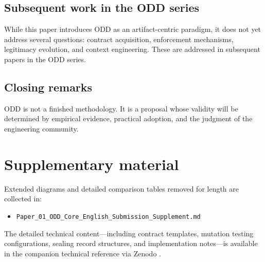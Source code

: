 \documentclass[conference]{IEEEtran}
\begin{document}
\subsection{Subsequent work in the ODD series}
While this paper introduces ODD as an artifact-centric paradigm, it does not yet address several questions: contract acquisition, enforcement mechanisms, legitimacy evolution, and context engineering. These are addressed in subsequent papers in the ODD series.

\subsection{Closing remarks}
ODD is not a finished methodology. It is a proposal whose validity will be determined by empirical evidence, practical adoption, and the judgment of the engineering community.

\appendices
\section{Supplementary material}
Extended diagrams and detailed comparison tables removed for length are collected in:
\begin{itemize}
\item \texttt{Paper\_01\_ODD\_Core\_English\_Submission\_Supplement.md}
\end{itemize}

The detailed technical content---including contract templates, mutation testing configurations, sealing record structures, and implementation notes---is available in the companion technical reference via Zenodo \cite{fu2026oddzenodo}.



\end{document}
